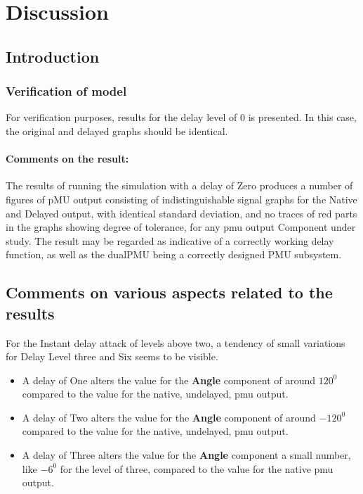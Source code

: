 \chapter{Discussion} \label{chap:Discussions}



\section{Introduction}


\subsection{Verification of model}

For verification purposes, results for the delay level of 0 is presented.  In this case, the original and delayed graphs should be identical.
\subsubsection{Comments on the result:}
The results of running the simulation with a delay of Zero produces a number of figures of pMU output consisting of indistinguishable signal graphs for the Native and Delayed output, with identical standard deviation, and no traces of red parts in the graphs showing degree of tolerance, for any \acrshort{pmu} output Component under study. The result may be regarded as indicative of a correctly working delay function, as well as the dualPMU being a correctly designed PMU subsystem. 




\section{Comments on various aspects related to the results}

For the Instant delay attack of levels above two, a tendency of small variations for Delay Level three and Six seems to be visible.
\begin{itemize}

\item A delay of One alters the value for the \textbf{Angle} component of around $120^0$ compared to the value for the native, undelayed, \acrshort{pmu} output.
\item A delay of Two alters the value for the \textbf{Angle} component of around $-120^0$ compared to the value for the native, undelayed, \acrshort{pmu} output.
   \item A delay of Three alters the value for the \textbf{Angle} component a small number, like  $-6^0$ for the level of three, compared to the value for the native  \acrshort{pmu} output.
\end{itemize}

